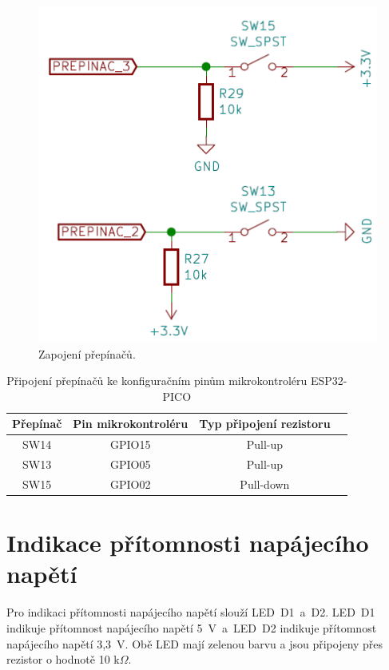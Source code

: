   \begin{figure}[!h]
    \begin{center}
      \includegraphics[scale=0.65]{obrazky/Prepinace_zapojeni.png}
    \end{center}
    \caption[Zapojení přepínačů]{Zapojení přepínačů.}
  \end{figure}

  \begin{table}[!h]
    \caption{Připojení přepínačů ke konfiguračním pinům mikrokontroléru ESP32-PICO}
    \begin{center}
        \begin{tabular}{|c|c|c|c|}
            \hline
            {\bf Přepínač}   & {\bf Pin mikrokontroléru} & {\bf Typ připojení rezistoru} \\
            \hline
            SW14      & GPIO15 & Pull-up \\
            \hline
            SW13      & GPIO05 & Pull-up \\
            \hline
            SW15      & GPIO02 & Pull-down \\
            \hline
        \end{tabular}    
    \end{center}
  \end{table}

  \section{Indikace přítomnosti napájecího napětí}
  Pro indikaci přítomnosti napájecího napětí slouží LED~D1~a~D2. LED~D1 indikuje přítomnost napájecího napětí 
  5~V~a~LED~D2 indikuje přítomnost napájecího napětí 3,3~V. Obě LED mají zelenou barvu a jsou připojeny přes
  rezistor o hodnotě 10 k$\Omega$.

